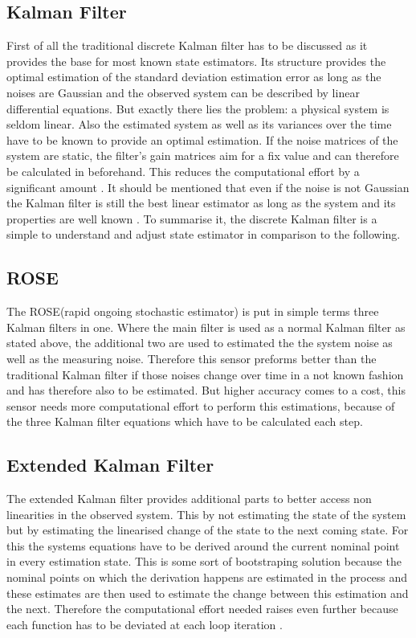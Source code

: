   \subsection{Kalman Filter}
  First of all the traditional discrete Kalman filter has to be discussed as it provides the base for most known state estimators.
  Its structure provides the optimal estimation of the standard deviation estimation error as long as the noises are Gaussian
  and the observed system can be described by linear differential equations.
  But exactly there lies the problem: a physical system is seldom linear.
  Also the estimated system as well as its variances over the time have to be known to provide an optimal estimation.
  If the noise matrices of the system are static, the filter's gain matrices aim for a fix value and can therefore be calculated in beforehand.
  This reduces the computational effort by a significant amount \cite{DavidWSchultz2004}.
  It should be mentioned that even if the noise is not Gaussian the Kalman filter is still the best
  linear estimator as long as the system and its properties are well known \cite{SimonDan2006Ose:}.
  To summarise it, the discrete Kalman filter is a simple to understand and adjust state estimator in comparison to the following.

  \subsection{ROSE}
  The ROSE(rapid ongoing stochastic estimator) is put in simple terms three Kalman filters in one.
  Where the main filter is used as a normal Kalman filter as stated above, the additional two are used to estimated the
  the system noise as well as the measuring noise. Therefore this sensor preforms better than the traditional Kalman filter
  if those noises change over time in a not known fashion and has therefore also to be estimated.
  But higher accuracy comes to a cost, this sensor needs more computational effort to perform this estimations,
  because of the three Kalman filter equations which have to be calculated each step\cite{DavidWSchultz2004}.

  \subsection{Extended Kalman Filter}
  The extended Kalman filter provides additional parts to better access non linearities in the observed system.
  This by not estimating the state of the system but by estimating the linearised change of the state
  to the next coming state. For this the systems equations have to be derived around the current nominal point in every estimation state.
  This is some sort of bootstraping solution because the nominal points on which the derivation happens are estimated in the process and
  these estimates are then used to estimate the change between this estimation and the next.
  Therefore the computational effort needed raises even further because each function has to be deviated at each loop iteration \cite{SimonDan2006Ose:}.

